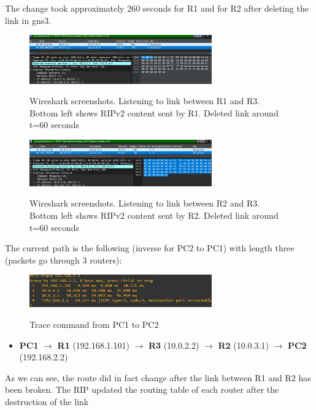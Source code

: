 \documentclass[10pt,a4paper]{ULBreport}
\begin{document}
The change took approximately 260 seconds for R1 and for R2 after deleting the link in gns3.

\begin{figure}[H]
    \center
    \caption{Wireshark screenshots. Listening to link between R1 and R3. Bottom left shows RIPv2 content sent by R1. Deleted link around t=60 seconds}
    \includegraphics[width=0.7\textwidth]{routetablechange.png}
    \label{routchange}
\end{figure}
\begin{figure}[H]
    \caption{Wireshark screenshots. Listening to link between R2 and R3. Bottom left shows RIPv2 content sent by R2. Deleted link around t=60 seconds}
    \center
    \includegraphics[width=0.7\textwidth]{routetablechange2.png}
    \label{routchange2}
\end{figure}

The current path is the following (inverse for PC2 to PC1) with length three (packets go through 3 routers):

\begin{figure}[H]
    \caption{Trace command from PC1 to PC2}
    \center
    \includegraphics[width=0.7\textwidth]{tracepc1pc2down.png}
    \label{tracedown}
\end{figure}

\begin{itemize}
    \item \textbf{PC1} $\rightarrow$ \textbf{R1} (192.168.1.101) $\rightarrow$ \textbf{R3} (10.0.2.2) $\rightarrow$ \textbf{R2} (10.0.3.1) $\rightarrow$ \textbf{PC2} (192.168.2.2)
\end{itemize}

As we can see, the route did in fact change after the link between R1 and R2 has been broken. The RIP updated the routing table of each router after the destruction of the link
\end{document}
